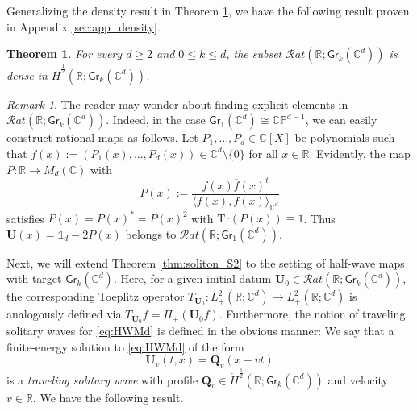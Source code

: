 \documentclass[11pt,reqno]{amsart}
\newtheorem{thm}{Theorem}[section]
\theoremstyle{definition}
\theoremstyle{remark}
\theoremstyle{remark}
\newtheorem*{remark*}{Remark}
\numberwithin{equation}{section}
\newcommand{\C}{\mathbb{C}}
\newcommand{\R}{\mathbb{R}}
\newcommand{\ov}{\overline}
\newcommand{\Qv}{\mathbf{Q}}
\newcommand{\Ub}{\mathbf{U}}
\newcommand{\Tr}{\mathrm{Tr}}
\newcommand{\Gr}{\mathsf{Gr}}
\begin{document}
Generalizing the density result in Theorem \ref{thm:dense_rational_Gr}, we have the following result proven in Appendix \ref{sec:app_density}.

\begin{thm} \label{thm:dense_rational_Gr}
For every $d\geq 2$ and $0 \leq k \leq d$, the subset $\mathcal{R}at(\R; \Gr_k(\C^d))$ is dense in $\dot{H}^{\frac 1 2}(\R; \Gr_k(\C^d))$.
\end{thm}


\begin{remark*}
The reader may wonder about finding explicit elements in $\mathcal{R}at(\R; \Gr_k(\C^d))$. Indeed, in the case $\Gr_1(\C^d) \cong \mathbb{CP}^{d-1}$, we can easily construct rational maps as follows. Let $P_1, \ldots, P_d \in \C[X]$ be polynomials such that $f(x) := (P_1(x), \ldots, P_d(x)) \in \C^d \setminus \{ 0 \}$ for all $x \in \R$. Evidently, the map $P : \R \to M_d(\C)$ with
$$
P(x) := \frac{f(x) \ov{f}(x)^t}{\langle f(x),  f(x) \rangle_{\C^d}} 
$$ 
satisfies $P(x)=P(x)^*=P(x)^2$ with $\Tr(P(x)) \equiv 1$. Thus $\Ub(x) = \mathds{1}_d - 2 P(x)$ belongs to $\mathcal{R}at(\R; \Gr_1(\C^d))$. 
\end{remark*}

Next, we will extend Theorem \ref{thm:soliton_S2} to the setting of half-wave maps with target $\Gr_k(\C^d)$. Here, for a given initial datum $\Ub_0 \in \mathcal{R}at(\R; \Gr_k(\C^d))$, the corresponding Toeplitz operator $T_{\Ub_0} : L^2_+(\R; \C^d) \to L^2_+(\R;\C^d)$ is analogously defined via $T_{\Ub_0} f = \Pi_+(\Ub_0 f)$. Furthermore, the notion of traveling solitary waves for \eqref{eq:HWMd} is defined in the obvious manner: We say that a finite-energy solution to \eqref{eq:HWMd} of the form
$$
\Ub_v(t,x) = \Qv_v(x-vt)
$$
is a {\em traveling solitary wave} with profile $\Qv_v \in \dot{H}^{\frac 1 2}(\R; \Gr_k(\C^d))$ and velocity $v \in \R$. We have the following result.
\end{document}
